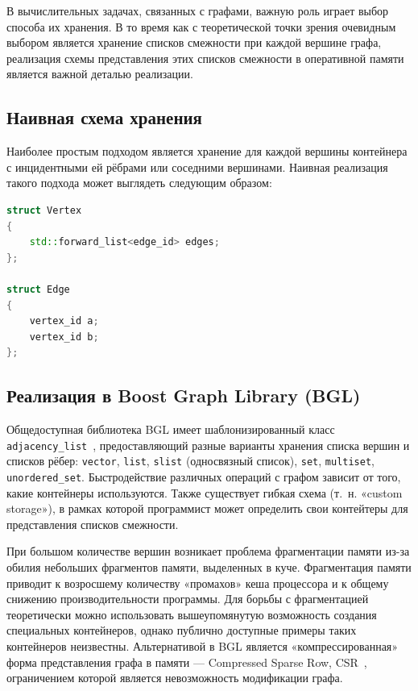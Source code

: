 \documentclass[intlimits,twoside,a4paper,11pt]{article}
\theoremstyle{definition}
\begin{document}
В вычислительных задачах, связанных с графами, важную роль играет выбор способа их хранения.
В то время как с теоретической точки зрения очевидным выбором является
хранение списков смежности при каждой вершине графа, реализация
схемы представления этих списков смежности в оперативной памяти
является важной деталью реализации.

\subsection{Наивная схема хранения}
Наиболее простым подходом 
является хранение для каждой вершины контейнера с инцидентными ей рёбрами или соседними вершинами. 
Наивная реализация такого подхода может выглядеть следующим образом:

\begin{lstlisting}[language=C++]
struct Vertex 
{
    std::forward_list<edge_id> edges;
};

struct Edge 
{
    vertex_id a;
    vertex_id b;
};
\end{lstlisting}

\subsection{Реализация в Boost Graph Library (BGL)}

Общедоступная библиотека BGL имеет шаблонизированный класс \texttt{adjacen\-cy\_list}~\cite{BGLadj}, предоставляющий разные варианты хранения списка вершин и списков рёбер:
\texttt{vector}, \texttt{list}, \texttt{slist} (односвязный список), \texttt{set}, \texttt{multiset}, \texttt{unordered\_set}. Быстродействие
различных операций с графом зависит от того, какие контейнеры используются. Также существует гибкая схема (т.~н. «custom storage»), в рамках
которой программист может определить свои контейтеры для представления списков смежности.

При большом количестве вершин возникает проблема фрагментации памяти
из-за обилия небольших фрагментов памяти, выделенных в
куче. Фрагментация памяти приводит к возросшему количеству «промахов»
кеша процессора и к общему снижению производительности
программы. Для борьбы с фрагментацией теоретически можно использовать
вышеупомянутую возможность создания специальных контейнеров, однако
публично доступные примеры таких контейнеров неизвестны. Альтернативой
в BGL является «компрессированная» форма представления графа в памяти
— Compressed Sparse Row, CSR~\cite{BGLCSR}, ограничением которой является
невозможность модификации графа.
\end{document}
